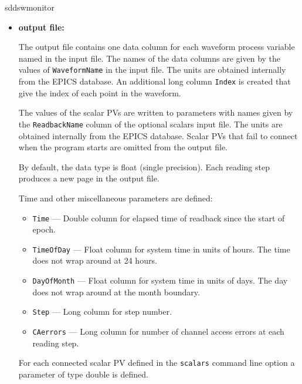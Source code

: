 \begin{sddsprog}{sddswmonitor}
\begin{itemize}
\item {\bf output file:}\par
The output file contains one data column for each waveform process variable named in the input file. The names
of the data columns are given by the values of {\verb+WaveformName+} in the input file. The units are obtained
internally from the EPICS database. An additional long column \verb+Index+ is created that give the index
of each point in the waveform.

The values of the scalar PVs are written to parameters with names given by the {\tt ReadbackName} column
of the optional scalars input file. The units are obtained internally from the EPICS database. Scalar
PVs that fail to connect when the program starts are omitted from the output file.

By default, the data type is float (single precision). Each reading step produces a new page in the output file.

Time and other miscellaneous parameters are defined: 
\begin{itemize}
        \item {\tt Time} --- Double column for elapsed time of readback since the start of epoch.
        \item {\tt TimeOfDay} --- Float column for system time in units of hours. The time does not wrap around at 24 hours.
        \item {\tt DayOfMonth} --- Float column for system time in units of days. The day does not wrap around at the month boundary.
        \item {\tt Step} --- Long column for step number.
        \item {\tt CAerrors} --- Long column for number of channel access errors at each reading step. 
\end{itemize}

For each connected scalar PV defined in the \verb+scalars+ command line option a parameter of type double is defined.


\end{itemize}
\end{sddsprog}
